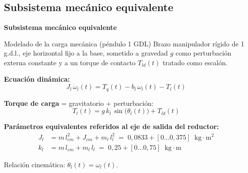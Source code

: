 \documentclass[aspectratio=169,t]{beamer}
\newcommand{\sectionslide}[1]{%
  \begin{frame}[plain]
    \vfill
    \centering
    {\Huge\bfseries\color{uncBlue} #1\par}
    \vfill
  \end{frame}
}
\begin{document}

\subsection{Subsistema mecánico equivalente}
\sectionslide{Subsistema mecánico equivalente}

\begin{frame}{Modelado de la carga mecánica (péndulo 1 GDL)}
{\small\color{uncGray}Brazo manipulador rígido de 1 g.d.l., eje horizontal fijo a la base, sometido a gravedad $g$ como perturbación externa constante y a un torque de contacto $T_{ld}(t)$ tratado como escalón.}\par
\vspace{3mm}

\textbf{Ecuación dinámica:}
\begin{equation*}
J_l\,\dot{\omega}_l(t) = T_q(t) - b_l\,\omega_l(t) - T_l(t)
\end{equation*}

\textbf{Torque de carga} = gravitatorio + perturbación:
\begin{equation*}
T_l(t) = g\,k_l\,\sin\!\big(\theta_l(t)\big) + T_{ld}(t)
\end{equation*}

\textbf{Parámetros equivalentes referidos al eje de salida del reductor:}
\begin{align*}
J_l &= m\,l_{cm}^2 + J_{cm} + m_l\,l_l^2 \;=\; 0{,}0833 + [0\dots 0{,}375]\;\;\text{kg}\cdot\text{m}^2 \\
k_l &= m\,l_{cm} + m_l\,l_l \;=\; 0{,}25 + [0\dots 0{,}75]\;\;\text{kg}\cdot\text{m}
\end{align*}

\vspace{1mm}
{\small Relación cinemática: $\dot{\theta}_l(t)=\omega_l(t)$.}
\end{frame}
\end{document}

